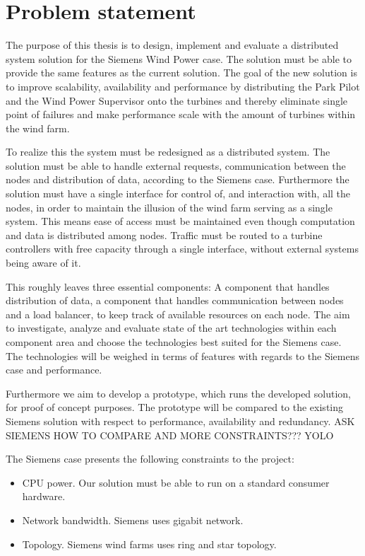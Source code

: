 \section{Problem statement}

The purpose of this thesis is to design, implement and evaluate a distributed system solution for the Siemens Wind Power case. The solution must be able to provide the same features as the current solution. The goal of the new solution is to improve scalability, availability and performance by distributing the Park Pilot and the Wind Power Supervisor onto the turbines and thereby eliminate single point of failures and make performance scale with the amount of turbines within the wind farm. 

To realize this the system must be redesigned as a distributed system. The solution must be able to handle external requests, communication between the nodes and distribution of data, according to the Siemens case. Furthermore the solution must have a single interface for control of, and interaction with, all the nodes, in order to maintain the illusion of the wind farm serving as a single system. This means ease of access must be maintained even though computation and data is distributed among nodes. Traffic must be routed to a turbine controllers with free capacity through a single interface, without external systems being aware of it.

This roughly leaves three essential components: A component that handles distribution of data, a component that handles communication between nodes and a load balancer, to keep track of available resources on each node. The aim to investigate, analyze and evaluate state of the art technologies within each component area and choose the technologies best suited for the Siemens case. The technologies will be weighed in terms of features with regards to the Siemens case and performance.

Furthermore we aim to develop a prototype, which runs the developed solution, for proof of concept purposes. The prototype will be compared to the existing Siemens solution with respect to performance, availability and redundancy. ASK SIEMENS HOW TO COMPARE AND MORE CONSTRAINTS??? YOLO 

The Siemens case presents the following constraints to the project:
\begin{itemize}
	\item CPU power. Our solution must be able to run on a standard consumer hardware.
	\item Network bandwidth. Siemens uses gigabit network.
	\item Topology. Siemens wind farms uses ring and star topology.
\end{itemize}


